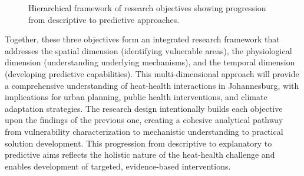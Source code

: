 \begin{figure}[h]
    \centering
    \caption{Hierarchical framework of research objectives showing progression from descriptive to predictive approaches.}
    \label{fig:aims_objectives}
\end{figure}

Together, these three objectives form an integrated research framework that addresses the spatial dimension (identifying vulnerable areas), the physiological dimension (understanding underlying mechanisms), and the temporal dimension (developing predictive capabilities). This multi-dimensional approach will provide a comprehensive understanding of heat-health interactions in Johannesburg, with implications for urban planning, public health interventions, and climate adaptation strategies. The research design intentionally builds each objective upon the findings of the previous one, creating a cohesive analytical pathway from vulnerability characterization to mechanistic understanding to practical solution development. This progression from descriptive to explanatory to predictive aims reflects the holistic nature of the heat-health challenge and enables development of targeted, evidence-based interventions.
